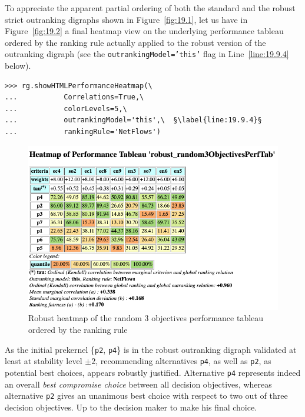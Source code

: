 To appreciate the apparent partial ordering of both the standard and the robust strict outranking digraphs shown in Figure~\vref{fig:19.1}, let us have in Figure~\vref{fig:19.2} a final heatmap view on the underlying performance tableau ordered by the \NetFlows ranking rule actually applied to the robust version of the outranking digraph (see the \texttt{outrankingModel='this'} flag in Line~\ref{line:19.9.4} below).
\begin{lstlisting}[caption={Computing a robust performance heatmap view},label=list:19.9]
>>> rg.showHTMLPerformanceHeatmap(\
...           Correlations=True,\
...           colorLevels=5,\
...           outrankingModel='this',\  §\label{line:19.9.4}§
...           rankingRule='NetFlows')
\end{lstlisting}
\begin{figure}[ht]
\includegraphics[width=\hsize]{Figures/19-2-robustHeatmap.png}
\caption{Robust heatmap of the random 3 objectives performance tableau ordered by the \NetFlows ranking rule} 
\label{fig:19.2}       %
\end{figure}

As the initial prekernel \{\texttt{p2}, \texttt{p4}\} is in the robust outranking digraph validated at least at stability level $\pm 2$, recommending alternatives \texttt{p4}, as well as \texttt{p2}, as potential best choices, appears robustly justified. Alternative \texttt{p4} represents indeed an overall \emph{best compromise choice} between all decision objectives, whereas alternative \texttt{p2} gives an unanimous best choice with respect to two out of three decision objectives. Up to the decision maker to make his final choice.

